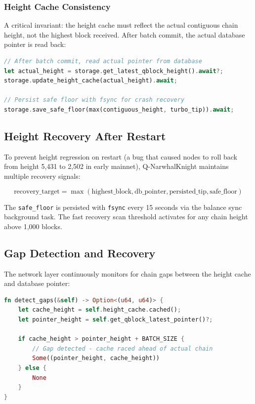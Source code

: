 \documentclass[11pt,a4paper]{article}
\begin{document}
\subsubsection{Height Cache Consistency}

A critical invariant: the height cache must reflect the actual contiguous chain height, not the highest block received. After batch commit, the actual database pointer is read back:

\begin{lstlisting}[language=Rust, caption={Height cache consistency}]
// After batch commit, read actual pointer from database
let actual_height = storage.get_latest_qblock_height().await?;
storage.update_height_cache(actual_height).await;

// Persist safe floor with fsync for crash recovery
storage.save_safe_floor(max(contiguous_height, turbo_tip)).await;
\end{lstlisting}

\subsection{Height Recovery After Restart}

To prevent height regression on restart (a bug that caused nodes to roll back from height 5,431 to 2,502 in early mainnet), Q-NarwhalKnight maintains multiple recovery signals:

\begin{equation}
\text{recovery\_target} = \max(\text{highest\_block}, \text{db\_pointer}, \text{persisted\_tip}, \text{safe\_floor})
\end{equation}

The \texttt{safe\_floor} is persisted with \texttt{fsync} every 15 seconds via the balance sync background task. The fast recovery scan threshold activates for any chain height above 1,000 blocks.

\subsection{Gap Detection and Recovery}

The network layer continuously monitors for chain gaps between the height cache and database pointer:

\begin{lstlisting}[language=Rust, caption={Gap detection algorithm}]
fn detect_gaps(&self) -> Option<(u64, u64)> {
    let cache_height = self.height_cache.cached();
    let pointer_height = self.get_qblock_latest_pointer()?;

    if cache_height > pointer_height + BATCH_SIZE {
        // Gap detected - cache raced ahead of actual chain
        Some((pointer_height, cache_height))
    } else {
        None
    }
}
\end{lstlisting}
\end{document}

